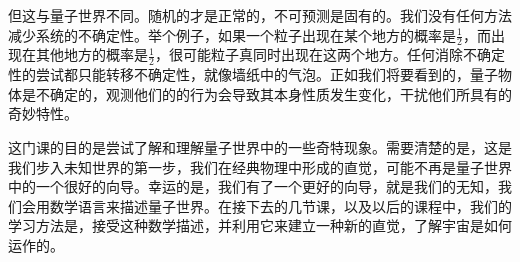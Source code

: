 但这与量子世界不同。随机的才是正常的，不可预测是固有的。我们没有任何方法减少系统的不确定性。举个例子，如果一个粒子出现在某个地方的概率是$\frac{1}{2}$，而出现在其他地方的概率是$\frac{1}{2}$，很可能粒子真同时出现在这两个地方。任何消除不确定性的尝试都只能转移不确定性，就像墙纸中的气泡。正如我们将要看到的，量子物体是不确定的，观测他们的的行为会导致其本身性质发生变化，干扰他们所具有的奇妙特性。\par
这门课的目的是尝试了解和理解量子世界中的一些奇特现象。需要清楚的是，这是我们步入未知世界的第一步，我们在经典物理中形成的直觉，可能不再是量子世界中的一个很好的向导。幸运的是，我们有了一个更好的向导，就是我们的无知，我们会用数学语言来描述量子世界。在接下去的几节课，以及以后的课程中，我们的学习方法是，接受这种数学描述，并利用它来建立一种新的直觉，了解宇宙是如何运作的。